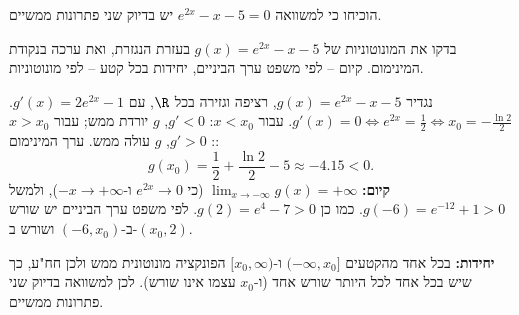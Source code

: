 
\begin{question}
הוכיחו כי למשוואה $e^{2x}-x-5=0$ יש בדיוק שני פתרונות ממשיים.
\end{question}

\begin{hint}
בדקו את המונוטוניות של $g(x)=e^{2x}-x-5$ בעזרת הנגזרת, ואת ערכה בנקודת המינימום. קיום – לפי משפט ערך הביניים, יחידות בכל קטע – לפי מונוטוניות.
\end{hint}

\begin{solution}
נגדיר $g(x)=e^{2x}-x-5$, רציפה וגזירה בכל $\R$, עם $g'(x)=2e^{2x}-1$. $g'(x)=0\iff e^{2x}=\frac12\iff x_0=-\frac{\ln2}{2}$. עבור $x<x_0$: $g'<0$, $g$ יורדת ממש; עבור $x>x_0$: $g'>0$, $g$ עולה ממש. ערך המינימום:
\[ g(x_0)=\frac12+\frac{\ln2}{2}-5\approx-4.15<0. \]
\textbf{קיום:} $\lim_{x\to-\infty}g(x)=+\infty$ (כי $e^{2x}\to0$ ו-$-x\to+\infty$), ולמשל $g(-6)=e^{-12}+1>0$. כמו כן $g(2)=e^4-7>0$. לפי משפט ערך הביניים יש שורש ב-$(-6,x_0)$ ושורש ב-$(x_0,2)$.

\textbf{יחידות:} בכל אחד מהקטעים $(-\infty,x_0]$ ו-$[x_0,\infty)$ הפונקציה מונוטונית ממש ולכן חח"ע, כך שיש בכל אחד לכל היותר שורש אחד (ו-$x_0$ עצמו אינו שורש). לכן למשוואה בדיוק שני פתרונות ממשיים.
\end{solution}
